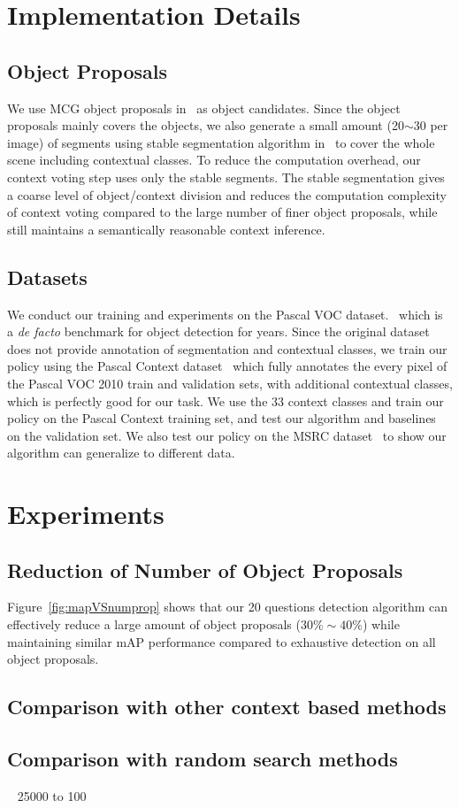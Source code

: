 \section{Implementation Details}
\subsection{Object Proposals}
We use MCG object proposals in~\cite{arbelaez2014multiscale} as object candidates. Since the object proposals mainly covers the objects,  we also generate a small amount (20$\sim$30 per image) of segments using stable segmentation algorithm in~\cite{chen2011piecing} to cover the whole scene including contextual classes. To reduce the computation overhead, our context voting step uses only the stable segments. The stable segmentation gives a coarse level of object/context division and reduces the computation complexity of context voting compared to the large number of finer object proposals, while still maintains a semantically reasonable context inference. 

\subsection{Datasets}
We conduct our training and experiments on the Pascal VOC dataset.~\cite{Everingham10} which is a \textit{de facto} benchmark for object detection for years. Since the original dataset does not provide annotation of segmentation and contextual classes, we train our policy using the Pascal Context dataset~\cite{mottaghi2014role} which fully annotates the every pixel of the Pascal VOC 2010 train and validation sets, with additional contextual classes, which is perfectly good for our task. We use the 33 context classes and train our policy on the Pascal Context training set, and test our algorithm and baselines on the validation set. We also test our policy on the MSRC dataset~\cite{shotton2006textonboost} to show our algorithm can generalize to different data. 

\section{Experiments}

\subsection{Reduction of Number of Object Proposals}

Figure~\ref{fig:mapVSnumprop} shows that our 20 questions detection algorithm can effectively reduce a large amount of object proposals ($30\% \sim 40\%$) while maintaining similar mAP performance compared to exhaustive detection on all object proposals.  

\subsection{Comparison with other context based methods}

\subsection{Comparison with random search methods}


~\cite{bogdan2012context} 25000 to 100 